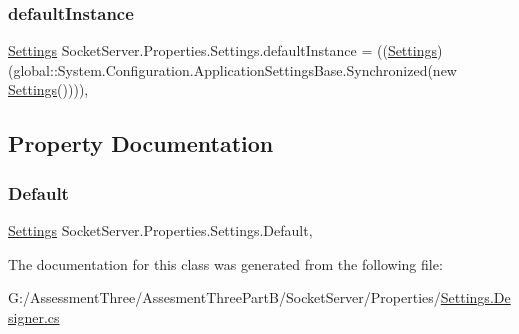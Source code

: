 \subsubsection{\texorpdfstring{default\+Instance}{defaultInstance}}
{\footnotesize\ttfamily \hyperlink{class_socket_server_1_1_properties_1_1_settings}{Settings} Socket\+Server.\+Properties.\+Settings.\+default\+Instance = ((\hyperlink{class_socket_server_1_1_properties_1_1_settings}{Settings})(global\+::\+System.\+Configuration.\+Application\+Settings\+Base.\+Synchronized(new \hyperlink{class_socket_server_1_1_properties_1_1_settings}{Settings}())))\hspace{0.3cm}{\ttfamily [static]}, {\ttfamily [private]}}



\subsection{Property Documentation}
\mbox{\label{class_socket_server_1_1_properties_1_1_settings_a7944b37c40f557280d233c0cfa179c2d}} 
\subsubsection{\texorpdfstring{Default}{Default}}
{\footnotesize\ttfamily \hyperlink{class_socket_server_1_1_properties_1_1_settings}{Settings} Socket\+Server.\+Properties.\+Settings.\+Default\hspace{0.3cm}{\ttfamily [static]}, {\ttfamily [get]}}



The documentation for this class was generated from the following file\+:\begin{DoxyCompactItemize}
\item 
G\+:/\+Assessment\+Three/\+Assesment\+Three\+Part\+B/\+Socket\+Server/\+Properties/\hyperlink{_socket_server_2_properties_2_settings_8_designer_8cs}{Settings.\+Designer.\+cs}\end{DoxyCompactItemize}
